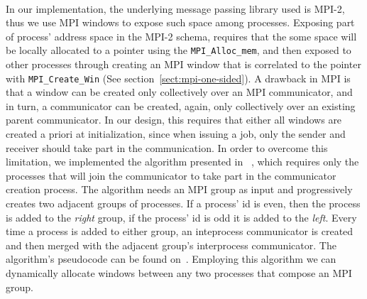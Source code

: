 \paragraph{}
In our implementation, the underlying message passing library used is MPI-2, thus we use MPI windows to
expose such space among processes.  
Exposing part of process' address space in the MPI-2 schema, requires that the some
space will be locally allocated to a pointer using the \texttt{MPI\_Alloc\_mem}, and then exposed to other processes
through creating an MPI window that is correlated to the pointer with \texttt{MPI\_Create\_Win} 
(See section~\ref{sect:mpi-one-sided}). 
A drawback in MPI is that a window can be created only collectively over an MPI communicator,
and in turn, a communicator can be created, again, only collectively over an existing parent communicator. 
In our design, this requires that either all windows are created a priori at initialization, 
since when issuing a job, only the sender and receiver should take part in the communication.  
In order to overcome this limitation, we implemented the algorithm presented in
~\cite{Dinan:2011:NCC:2042476.2042508}, which requires only the processes that will join the communicator to
take part in the communicator creation process.  The algorithm needs an MPI group as input and progressively
creates two adjacent groups of processes.  If a process' id is even, then the process is added to the \emph{right}
group, if the process' id is odd it is added to the \emph{left}.  Every time a process is added to either group, an
inteprocess communicator is created and then merged with the adjacent group's interprocess communicator. The 
algorithm's pseudocode can be found on~\cite[p.287~]{Dinan:2011:NCC:2042476.2042508}.
Employing this algorithm we can dynamically allocate windows between any two processes that compose an MPI group.

